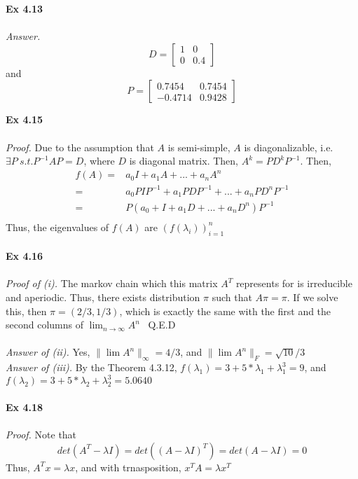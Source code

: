 \documentclass[letterpaper,12pt]{article}
\theoremstyle{definition}
\begin{document}
\begin{spacing}{1.3}{}
\textbf{Ex 4.13} \\\\
\emph{Answer.}
\[D = \begin{bmatrix}
    1 & 0 \\
    0 & 0.4
  \end{bmatrix}\]
and
\[P = \begin{bmatrix}
        0.7454 & 0.7454 \\
        -0.4714 & 0.9428
      \end{bmatrix}\]

\textbf{Ex 4.15} \\\\
\emph{Proof.} Due to the assumption that $A$ is semi-simple, $A$ is diagonalizable, i.e. $\exists P \ s.t. P^{-1}AP = D$, where $D$ is diagonal matrix. Then, $A^k = P D^k P^{-1}$. Then,
\begin{align*}
 f(A) =& a_0 I + a_1 A + ... + a_n A^n  \\
    =& a_0 PIP^{-1} + a_1 PDP^{-1} + ... + a_n PD^{n}P^{-1} \\
   =& P(a_0 + I + a_1 D + ... + a_n D^n)P^{-1} \\
\end{align*}
Thus, the eigenvalues of $f(A)$ are $(f(\lambda_i))_{i=1}^{n}$ \\\\
\textbf{Ex 4.16} \\\\
\emph{Proof of (i).} The markov chain which this matrix $A^T$ represents for is irreducible and aperiodic. Thus, there exists distribution $\pi$ such that $A \pi  = \pi$. If we solve this, then $\pi = (2/3,1/3) $, which is exactly the same with the first and the second columns of $\lim_{n \rightarrow \infty} A^n$ \ Q.E.D \\\\
\emph{Answer of (ii).} Yes, $\| \lim A^n \|_{\infty} = 4/3 $, and $\| \lim A^n \|_{F} = \sqrt{10}/3$ \\
\emph{Answer of (iii).} By the Theorem 4.3.12, $f(\lambda_1) = 3 + 5*\lambda_1 + \lambda_{1}^{3} = 9$, and $f(\lambda_2) = 3 + 5*\lambda_2 + \lambda_{2}^{3} = 5.0640$ \\\\
\textbf{Ex 4.18} \\\\
\emph{Proof.} Note that
\[det(A^T - \lambda I ) = det((A-\lambda I)^T) = det(A-\lambda I)=0\]
Thus, $A^T x = \lambda x$, and with trnasposition, $x^T A = \lambda x^T$ \\\\

\end{spacing}
\end{document}
